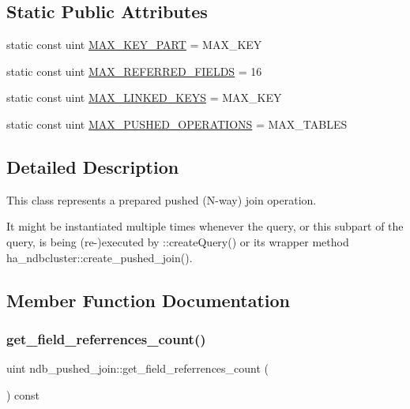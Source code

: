 \subsection*{Static Public Attributes}
\begin{DoxyCompactItemize}
\item 
static const uint \mbox{\hyperlink{classndb__pushed__join_a818793739d73a5a0fe90088b222089f9}{M\+A\+X\+\_\+\+K\+E\+Y\+\_\+\+P\+A\+RT}} = M\+A\+X\+\_\+\+K\+EY
\item 
static const uint \mbox{\hyperlink{classndb__pushed__join_a5045579b5ff3551499b1c23350136079}{M\+A\+X\+\_\+\+R\+E\+F\+E\+R\+R\+E\+D\+\_\+\+F\+I\+E\+L\+DS}} = 16
\item 
static const uint \mbox{\hyperlink{classndb__pushed__join_a5e0037b0b366aa2a2eb205786365fac8}{M\+A\+X\+\_\+\+L\+I\+N\+K\+E\+D\+\_\+\+K\+E\+YS}} = M\+A\+X\+\_\+\+K\+EY
\item 
static const uint \mbox{\hyperlink{classndb__pushed__join_a8e7e7078e5d85fcc3b2b5cb349356797}{M\+A\+X\+\_\+\+P\+U\+S\+H\+E\+D\+\_\+\+O\+P\+E\+R\+A\+T\+I\+O\+NS}} = M\+A\+X\+\_\+\+T\+A\+B\+L\+ES
\end{DoxyCompactItemize}


\subsection{Detailed Description}
This class represents a prepared pushed (N-\/way) join operation.

It might be instantiated multiple times whenever the query, or this subpart of the query, is being (re-\/)executed by \+::create\+Query() or it\textquotesingle{}s wrapper method ha\+\_\+ndbcluster\+::create\+\_\+pushed\+\_\+join(). 

\subsection{Member Function Documentation}
\mbox{\label{classndb__pushed__join_a22900c182d2a4368cd9c77bb16707b55}} 
\subsubsection{\texorpdfstring{get\+\_\+field\+\_\+referrences\+\_\+count()}{get\_field\_referrences\_count()}}
{\footnotesize\ttfamily uint ndb\+\_\+pushed\+\_\+join\+::get\+\_\+field\+\_\+referrences\+\_\+count (\begin{DoxyParamCaption}{ }\end{DoxyParamCaption}) const\hspace{0.3cm}{\ttfamily [inline]}}

